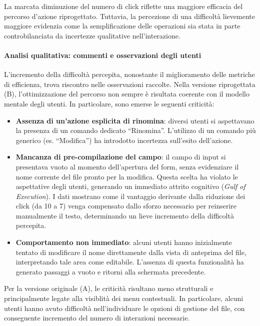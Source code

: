 La marcata diminuzione del numero di click riflette una maggiore efficacia del percorso d'azione riprogettato. Tuttavia, la percezione di una difficoltà lievemente maggiore evidenzia come la semplificazione delle operazioni sia stata in parte controbilanciata da incertezze qualitative nell'interazione.

\paragraph{Analisi qualitativa: commenti e osservazioni degli utenti}

L’incremento della difficoltà percepita, nonostante il miglioramento delle metriche di efficienza, trova riscontro nelle osservazioni raccolte. Nella versione riprogettata (B), l’ottimizzazione del percorso non sempre è risultata coerente con il modello mentale degli utenti. In particolare, sono emerse le seguenti criticità:

\begin{itemize}
	\item \textbf{Assenza di un’azione esplicita di rinomina}: diversi utenti si aspettavano la presenza di un comando dedicato ``Rinomina''. L’utilizzo di un comando più generico (es. ``Modifica'') ha introdotto incertezza sull’esito dell’azione.

	\item \textbf{Mancanza di pre-compilazione del campo}: il campo di input si presentava vuoto al momento dell’apertura del form, senza evidenziare il nome corrente del file pronto per la modifica. Questa scelta ha violato le aspettative degli utenti, generando un immediato attrito cognitivo (\textit{Gulf of Execution}). I dati mostrano come il vantaggio derivante dalla riduzione dei click (da 10 a 7) venga compensato dallo sforzo necessario per reinserire manualmente il testo, determinando un lieve incremento della difficoltà percepita.

	\item \textbf{Comportamento non immediato}: alcuni utenti hanno inizialmente tentato di modificare il nome direttamente dalla vista di anteprima del file, interpretando tale area come editabile. L’assenza di questa funzionalità ha generato passaggi a vuoto e ritorni alla schermata precedente.
\end{itemize}

Per la versione originale (A), le criticità risultano meno strutturali e principalmente legate alla visiblità dei menu contestuali. In particolare, alcuni utenti hanno avuto difficoltà nell’individuare le opzioni di gestione del file, con conseguente incremento del numero di interazioni necessarie.

